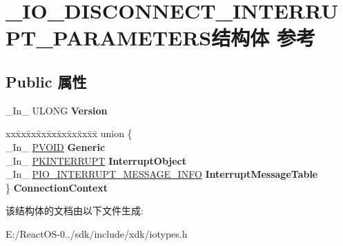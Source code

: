 \hypertarget{struct___i_o___d_i_s_c_o_n_n_e_c_t___i_n_t_e_r_r_u_p_t___p_a_r_a_m_e_t_e_r_s}{}\section{\+\_\+\+I\+O\+\_\+\+D\+I\+S\+C\+O\+N\+N\+E\+C\+T\+\_\+\+I\+N\+T\+E\+R\+R\+U\+P\+T\+\_\+\+P\+A\+R\+A\+M\+E\+T\+E\+R\+S结构体 参考}
\label{struct___i_o___d_i_s_c_o_n_n_e_c_t___i_n_t_e_r_r_u_p_t___p_a_r_a_m_e_t_e_r_s}
\subsection*{Public 属性}
\begin{DoxyCompactItemize}
\item 
\mbox{\label{struct___i_o___d_i_s_c_o_n_n_e_c_t___i_n_t_e_r_r_u_p_t___p_a_r_a_m_e_t_e_r_s_ac0bc9ac3c41c1b62dc617d13f0555530}} 
\+\_\+\+In\+\_\+ U\+L\+O\+NG {\bfseries Version}
\item 
\mbox{\label{struct___i_o___d_i_s_c_o_n_n_e_c_t___i_n_t_e_r_r_u_p_t___p_a_r_a_m_e_t_e_r_s_a1a67ddf1d4a539ee6544afe9453cc630}} 
\begin{tabbing}
xx\=xx\=xx\=xx\=xx\=xx\=xx\=xx\=xx\=\kill
union \{\\
\>\_In\_ \hyperlink{interfacevoid}{PVOID} {\bfseries Generic}\\
\>\_In\_ \hyperlink{struct___k_i_n_t_e_r_r_u_p_t}{PKINTERRUPT} {\bfseries InterruptObject}\\
\>\_In\_ \hyperlink{struct___i_o___i_n_t_e_r_r_u_p_t___m_e_s_s_a_g_e___i_n_f_o}{PIO\_INTERRUPT\_MESSAGE\_INFO} {\bfseries InterruptMessageTable}\\
\} {\bfseries ConnectionContext}\\

\end{tabbing}\end{DoxyCompactItemize}


该结构体的文档由以下文件生成\+:\begin{DoxyCompactItemize}
\item 
E\+:/\+React\+O\+S-\/0../sdk/include/xdk/iotypes.\+h\end{DoxyCompactItemize}
